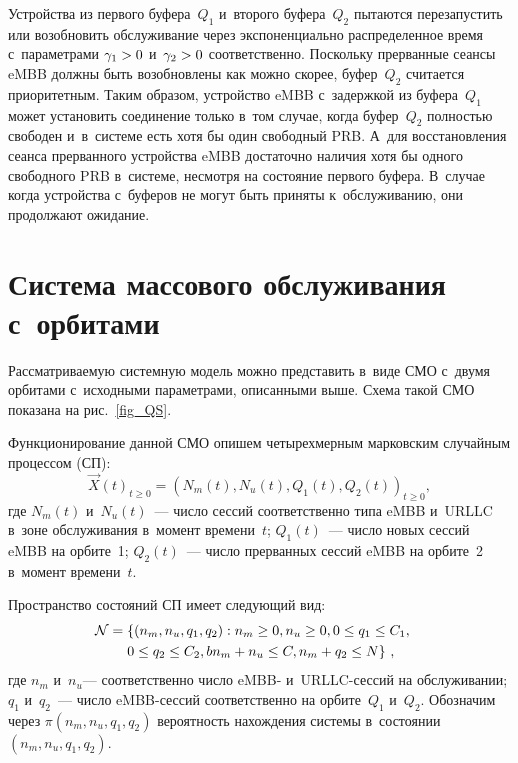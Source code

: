 \begin{multicols}{2}
 Устройства из первого буфера~$Q_1$ и~второго буфера~$Q_2$ пытаются перезапустить или возобновить\linebreak 
 обслуживание через экспоненциально распределенное время с~параметрами 
 $ \gamma_ {1}\hm> 0 $ и~$ \gamma_ {2}\hm> 0 $ соответственно. Поскольку прерванные 
 сеансы \mbox{eMBB} должны быть возобновлены как можно скорее,  буфер~$Q_2$ считается приоритетным. 
 Таким образом, устройство \mbox{eMBB} с~задержкой из буфера~$Q_1$ может установить соединение только в~том случае, 
 когда буфер~$Q_2$ полностью свободен и~в~системе есть хотя бы один свободный PRB. А~для восстановления сеанса 
 прерванного устройства \mbox{eMBB} достаточно наличия хотя бы одного свободного PRB в~системе, несмотря на состояние
  первого буфера. В~случае когда устройства с~буферов не могут быть приняты к~обслуживанию, они продолжают
   ожидание.

\section{Система массового обслуживания с~орбитами}

Рассматриваемую системную модель можно представить в~виде СМО с~двумя 
орбитами с~исходными параметрами, описанными выше. Схема такой СМО показана на рис.~\ref{fig_QS}.

Функционирование данной СМО опишем четырехмерным марковским случайным процессом (СП): 
$$
\vec{X}(t)_{t\geq 0}=\left(N_{{m}}(t), N_{{u}}(t),Q_{1}(t), Q_{2}(t)\right)_{t \geq 0},
$$ 
где $N_{{m}} (t)$ и~$N_{{u}} (t)$~--- число сессий соответственно типа \mbox{eMBB} и~URLLC в~зоне 
обслуживания в~момент времени~$t$;
$Q_{1} (t)$~--- число новых сессий \mbox{eMBB} на орбите~1; $Q_{2} (t)$~--- число прерванных сессий 
\mbox{eMBB} на орбите~2  в~момент времени~$t$.

Пространство состояний СП имеет следующий вид:
\begin{multline}
\hspace*{-8pt}\mathcal{N}=   \left\{ \left( n_{{m}},n_{{u}},q_{1},q_{2} \right):n_{{m}}\ge 0,n_{{u}}\ge 0, 
    0\le q_{1}\le C_{1},\right.\\
   \left. 0\le q_{2}\le C_{2}, bn_{{m}}+n_{{u}}\le C,n_{{m}}+q_{2}\le N\right\}\,,
      \label{eq_N}
\end{multline}
где  $n_{{m}}$ и~$n_{{u}}$--- соответственно число \mbox{eMBB}- и~\mbox{URLLC}-сес\-сий на 
обслуживании; 
$q_1$ и~$q_2$~--- число \mbox{eMBB}-сес\-сий соответственно на орбите~$Q_{1}$ и~$Q_{2}$. Обозначим через 
$ \pi \left( n_{m},n_{u},q_1,q_2 \right)$  вероятность нахождения сис\-те\-мы в~со\-сто\-янии 
$\left( n_{m},n_{u},q_1,q_2 \right)$.




\end{multicols}

